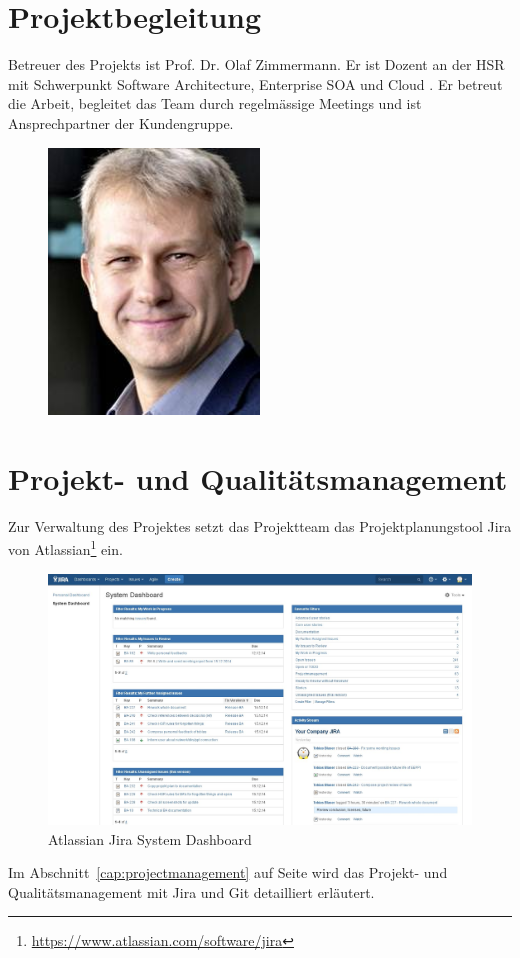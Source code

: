 	\section{Projektbegleitung}
	Betreuer des Projekts ist Prof. Dr. Olaf Zimmermann.
	Er ist Dozent an der HSR mit Schwerpunkt Software Architecture, Enterprise SOA und Cloud \cite{zimmermann_ifs_2014}. 
	Er betreut die Arbeit, begleitet das Team durch regelmässige Meetings und ist Ansprechpartner der Kundengruppe.
	
	\begin{figure}[H]
		\begin{minipage}[b]{0.5\linewidth}
			\includegraphics[width=0.5\textwidth]{projectPlan/media/img/ozimmermann.jpg}
			\centering
			\caption{\teacher}
			\label{fig:olafzimmermann}
		\end{minipage}
	\end{figure}


	\section{Projekt- und Qualitätsmanagement}
		Zur Verwaltung des Projektes setzt das Projektteam das Projektplanungstool Jira von Atlassian\footnote{\url{https://www.atlassian.com/software/jira}} ein.
		
		\begin{figure}[H]
			\includegraphics[width=\textwidth]{projectPlan/media/img/jiraSystemdashboard.jpg}
			\centering
			\caption{Atlassian Jira System Dashboard}
			\label{fig:jiraVersions}
		\end{figure}
		
		Im Abschnitt~\ref{cap:projectmanagement} auf Seite \pageref{cap:projectmanagement} wird das Projekt- und Qualitätsmanagement mit Jira und Git detailliert erläutert.
	
